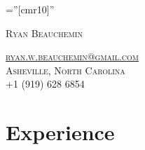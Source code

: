 \documentclass[a4paper, 9pt]{article} %
\begin{document}
\pagestyle{empty} %

\font\fb=''[cmr10]'' %

\vspace{-10pt}
\par{\huge \textsc{Ryan Beauchemin}\par}
\textsc{\href{mailto:ryan.w.beauchemin@gmail.com}{ryan.w.beauchemin@gmail.com}}\\
\textsc{Asheville, North Carolina} \\
+1 (919) 628 6854\\

\section{Experience} %
\end{document}
